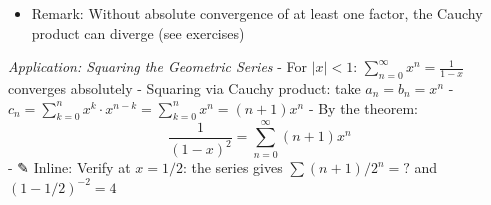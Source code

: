 \documentclass[
  10pt,
  letterpaper,
]{scrbook}
\providecommand{\tightlist}{%
  \setlength{\itemsep}{0pt}\setlength{\parskip}{0pt}}
\begin{document}
\begin{itemize}
  \begin{itemize}
  \tightlist
  \item
    Let \(A_n = \sum_{j=0}^{n} a_j\), \(B_n = \sum_{k=0}^{n} b_k\),
    \(C_n = \sum_{m=0}^{n} c_m\)
  \item
    Let \(\beta_n = B_n - B\) (so \(\beta_n \to 0\))
  \item
    Compute:
    \[C_n = \sum_{m=0}^{n} \sum_{k=0}^{m} a_k b_{m-k} = \sum_{k=0}^{n} a_k \sum_{m=k}^{n} b_{m-k} = \sum_{k=0}^{n} a_k B_{n-k}\]
  \item
    Rewrite:
    \(C_n = \sum_{k=0}^{n} a_k (B + \beta_{n-k}) = A_n B + \sum_{k=0}^{n} a_k \beta_{n-k}\)
  \item
    Need to show \(\sum_{k=0}^{n} a_k \beta_{n-k} \to 0\)
  \item
    Let \(\alpha = \sum |a_j| < \infty\) and \(M = \sup_n |\beta_n|\)
  \item
    Given \(\varepsilon > 0\), choose \(N\) such that
    \(|\beta_m| < \varepsilon\) for \(m > N\)
  \item
    Split:
    \(\sum_{k=0}^{n} a_k \beta_{n-k} = \sum_{k=0}^{n-N-1} a_k \beta_{n-k} + \sum_{k=n-N}^{n} a_k \beta_{n-k}\)
  \item
    First sum:
    \(|\sum_{k=0}^{n-N-1} a_k \beta_{n-k}| \leq \varepsilon \sum_{k=0}^{n-N-1} |a_k| \leq \varepsilon \alpha\)
  \item
    Second sum:
    \(|\sum_{k=n-N}^{n} a_k \beta_{n-k}| \leq M \sum_{k=n-N}^{n} |a_k| \to 0\)
    as \(n \to \infty\) (tail of convergent series)
  \item
    Therefore \(\sum_{k=0}^{n} a_k \beta_{n-k} \to 0\), so
    \(C_n \to AB\)
  \end{itemize}
\item
  Remark: Without absolute convergence of at least one factor, the
  Cauchy product can diverge (see exercises)
\end{itemize}

\emph{Application: Squaring the Geometric Series} - For \(|x| < 1\):
\(\sum_{n=0}^{\infty} x^n = \frac{1}{1-x}\) converges absolutely -
Squaring via Cauchy product: take \(a_n = b_n = x^n\) -
\(c_n = \sum_{k=0}^{n} x^k \cdot x^{n-k} = \sum_{k=0}^{n} x^n = (n+1)x^n\)
- By the theorem: \[\frac{1}{(1-x)^2} = \sum_{n=0}^{\infty} (n+1)x^n\] -
✎ Inline: Verify at \(x = 1/2\): the series gives \(\sum (n+1)/2^n = ?\)
and \((1 - 1/2)^{-2} = 4\)
\end{document}
